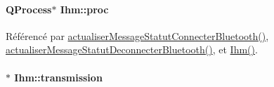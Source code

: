 \paragraph[{\texorpdfstring{proc}{proc}}]{\setlength{\rightskip}{0pt plus 5cm}Q\+Process$\ast$ Ihm\+::proc\hspace{0.3cm}{\ttfamily [private]}}\hypertarget{class_ihm_aa1bea3b8f9bad5c19a662a2b455895fb}{}\label{class_ihm_aa1bea3b8f9bad5c19a662a2b455895fb}


Référencé par \hyperlink{class_ihm_a5d7e6bdacfedc0f0dc4d7b3516454788}{actualiser\+Message\+Statut\+Connecter\+Bluetooth()}, \hyperlink{class_ihm_ad73cc62bafa9c43288f69fbac2b80508}{actualiser\+Message\+Statut\+Deconnecter\+Bluetooth()}, et \hyperlink{class_ihm_a50a7a15775452923868348bdbe4fa51e}{Ihm()}.

\paragraph[{\texorpdfstring{transmission}{transmission}}]{$\ast$ Ihm\+::transmission\hspace{0.3cm}{\ttfamily [private]}}\hypertarget{class_ihm_aa8fa25758a4f3e47e07d1d98f6bbab33}{}\label{class_ihm_aa8fa25758a4f3e47e07d1d98f6bbab33}


